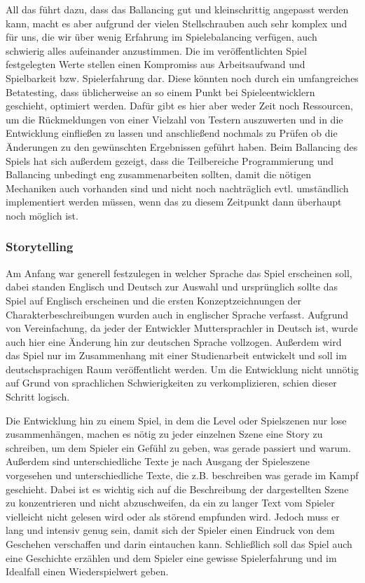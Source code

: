 All das führt dazu, dass das Ballancing gut und kleinschrittig angepasst werden kann, macht es aber aufgrund der vielen Stellschrauben auch sehr komplex und für uns, die wir über wenig Erfahrung im Spielebalancing verfügen, auch schwierig alles aufeinander anzustimmen. Die im veröffentlichten Spiel festgelegten Werte stellen einen Kompromiss aus Arbeitsaufwand und Spielbarkeit bzw. Spielerfahrung dar. Diese könnten noch durch ein umfangreiches Betatesting, dass üblicherweise an so einem Punkt bei Spieleentwicklern geschieht, optimiert werden. Dafür gibt es hier aber weder Zeit noch Ressourcen, um die Rückmeldungen von einer Vielzahl von Testern auszuwerten und in die Entwicklung einfließen zu lassen und anschließend nochmals zu Prüfen ob die Änderungen zu den gewünschten Ergebnissen geführt haben. Beim Ballancing des Spiels hat sich außerdem gezeigt, dass die Teilbereiche Programmierung und Ballancing unbedingt eng zusammenarbeiten sollten, damit die nötigen Mechaniken auch vorhanden sind und nicht noch nachträglich evtl. umständlich implementiert werden müssen, wenn das zu diesem Zeitpunkt dann überhaupt noch möglich ist.

\subsubsection{Storytelling} Am Anfang war generell festzulegen in welcher Sprache das Spiel erscheinen soll, dabei standen Englisch und Deutsch zur Auswahl und ursprünglich sollte das Spiel auf Englisch erscheinen und die ersten Konzeptzeichnungen der Charakterbeschreibungen wurden auch in englischer Sprache verfasst. Aufgrund von Vereinfachung, da jeder der Entwickler Muttersprachler in Deutsch ist, wurde auch hier eine Änderung hin zur deutschen Sprache vollzogen. Außerdem wird das Spiel nur im Zusammenhang mit einer Studienarbeit entwickelt und soll im deutschsprachigen Raum veröffentlicht werden. Um die Entwicklung nicht unnötig auf Grund von sprachlichen Schwierigkeiten zu verkomplizieren, schien dieser Schritt logisch. 

Die Entwicklung hin zu einem Spiel, in dem die Level oder Spielszenen nur lose zusammenhängen, machen es nötig zu jeder einzelnen Szene eine Story zu schreiben, um dem Spieler ein Gefühl zu geben, was gerade passiert und warum. Außerdem sind unterschiedliche Texte je nach Ausgang der Spieleszene vorgesehen und unterschiedliche Texte, die z.B. beschreiben was gerade im Kampf geschieht. Dabei ist es wichtig sich auf die Beschreibung der dargestellten Szene zu konzentrieren und nicht abzuschweifen, da ein zu langer Text vom Spieler vielleicht nicht gelesen wird oder als störend empfunden wird. Jedoch muss er lang und intensiv genug sein, damit sich der Spieler einen Eindruck von dem Geschehen verschaffen und darin eintauchen kann. Schließlich soll das Spiel auch eine Geschichte erzählen und dem Spieler eine gewisse Spielerfahrung und im Idealfall einen Wiederspielwert geben. 

